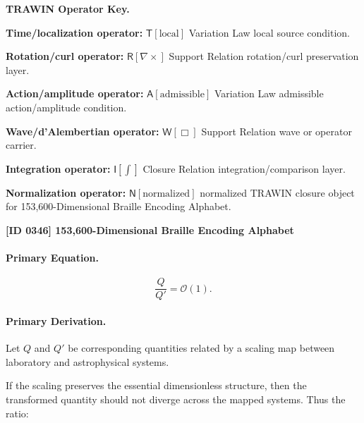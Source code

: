 \par\vspace{0.45\baselineskip}
\noindent\begin{minipage}[t]{\linewidth}
\begingroup
\small
\raggedright
\textbf{TRAWIN Operator Key.}\par
\noindent\textbf{Time/localization operator:} $\mathsf{T}\!\left[\mathrm{local}\right]$ Variation Law local source condition.\par
\noindent\textbf{Rotation/curl operator:} $\mathsf{R}\!\left[\nabla\times\right]$ Support Relation rotation/curl preservation layer.\par
\noindent\textbf{Action/amplitude operator:} $\mathsf{A}\!\left[\mathrm{admissible}\right]$ Variation Law admissible action/amplitude condition.\par
\noindent\textbf{Wave/d'Alembertian operator:} $\mathsf{W}\!\left[\Box\right]$ Support Relation wave or operator carrier.\par
\noindent\textbf{Integration operator:} $\mathsf{I}\!\left[\int\right]$ Closure Relation integration/comparison layer.\par
\noindent\textbf{Normalization operator:} $\mathsf{N}\!\left[\mathrm{normalized}\right]$ normalized TRAWIN closure object for 153,600-Dimensional Braille Encoding Alphabet.\par
\endgroup
\end{minipage}

\clearpage
\noindent\textbf{[ID 0346] 153,600-Dimensional Braille Encoding Alphabet}\par
\vspace{0.35em}
\paragraph{Primary Equation.}
\begin{equation}
\frac{Q}{Q'}
=
\mathcal{O}(1).
\end{equation}

\paragraph{Primary Derivation.}
Let $Q$ and $Q'$ be corresponding quantities related by a scaling map between laboratory and astrophysical systems.

If the scaling preserves the essential dimensionless structure, then the transformed quantity should not diverge across the mapped systems. Thus the ratio:


